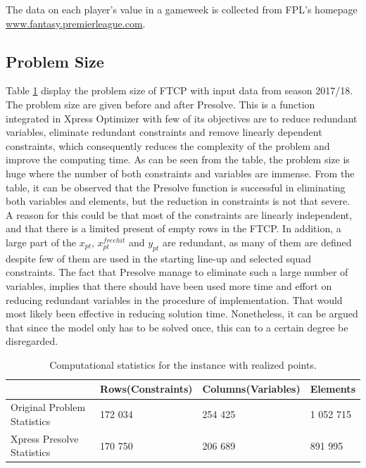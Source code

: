 \newpar

The data on each player's value in a gameweek is collected from FPL's homepage \url{www.fantasy.premierleague.com}. 

\subsection{Problem Size}

Table \ref{tab:computational_statistics} display the problem size of FTCP with input data from season 2017/18. The problem size are given before and after Presolve. This is a function integrated in Xpress Optimizer with few of its objectives are to reduce redundant variables, eliminate redundant constraints and remove linearly dependent constraints, which consequently reduces the complexity of the problem and improve the computing time. As can be seen from the table, the problem size is huge where the number of both constraints and variables are immense. From the table, it can be observed that the Presolve function is successful in eliminating both variables and elements, but the reduction in constraints is not that severe. A reason for this could be that most of the constraints are linearly independent, and that there is a limited present of empty rows in the FTCP. In addition, a large part of the $x_{pt}$, $x_{pt}^{freehit}$ and $y_{pt}$ are redundant, as many of them are defined despite few of them are used in the starting line-up and selected squad constraints. The fact that Presolve manage to eliminate such a large number of variables, implies that there should have been used more time and effort on reducing redundant variables in the procedure of implementation. That would most likely been effective in reducing solution time. Nonetheless, it can be argued that since the model only has to be solved once, this can to a certain degree be disregarded. 


\begin{table}[H]
\centering
\caption{Computational statistics for the instance with realized points.}
\label{tab:computational_statistics}
\begin{tabular}{@{}llll@{}}
\toprule
                            & Rows(Constraints)    & Columns(Variables) & Elements \\ \midrule
Original Problem Statistics & 172 034 & 254 425  & 1 052 715  \\
Xpress Presolve Statistics  & 170 750 & 206 689  & 891 995   \\ \bottomrule
\end{tabular}
\end{table}


